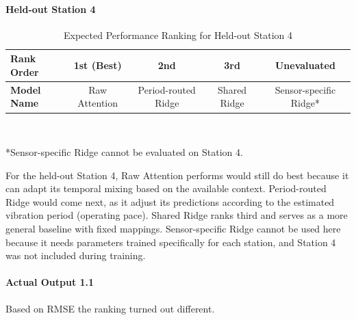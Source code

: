 \documentclass[a4, 12pt]{article}
\begin{document}
\paragraph{Held-out Station 4}

\begin{table}[htbp]
\centering
\caption{Expected Performance Ranking for Held-out Station 4}
\label{tab:heldout_ranking}
\vspace{2mm}
\begin{tabular}{@{} l c c c c @{}}
\toprule
\textbf{Rank Order} & \textbf{1st (Best)} & \textbf{2nd} & \textbf{3rd} & \textbf{Unevaluated} \\
\midrule
\textbf{Model Name} & Raw Attention & Period-routed Ridge & Shared Ridge & Sensor-specific Ridge* \\
\bottomrule
\end{tabular}
\\[1.5ex]
\raggedright \footnotesize{*Sensor-specific Ridge cannot be evaluated on Station 4.}
\end{table}

For the held-out Station 4, Raw Attention performs would still do best because it can adapt its temporal mixing based on the available context. Period-routed Ridge would come next, as it adjust its predictions according to the estimated vibration period (operating pace). Shared Ridge ranks third and serves as a more general baseline with fixed mappings. Sensor-specific Ridge cannot be used here because it needs parameters trained specifically for each station, and Station 4 was not included during training.

\paragraph{Actual  Output 1.1}
Based on RMSE the ranking turned out different. 
\end{document}
